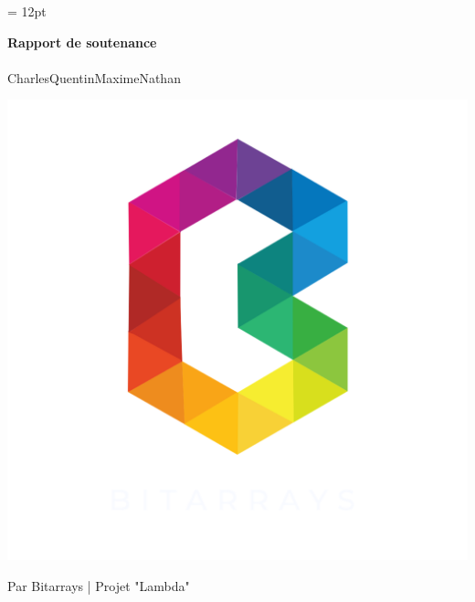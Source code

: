 \documentclass{article}
\begin{document}
    \headsep = 12pt
		\begin{center}
			\begin{LARGE}
				\textbf{Rapport de soutenance}
				\paragraph{}Charles\hspace{0.7cm}Quentin\hspace{0.7cm}Maxime\hspace{0.7cm}Nathan
			\end{LARGE}
		\end{center}
		\vspace{1.5cm}
		\begin{center}
			\includegraphics[scale=0.3]{LogoBitarrays.png}
		\end{center}
		\begin{center}
			\par Par Bitarrays | Projet "Lambda"
		\end{center}
	
\end{document}
